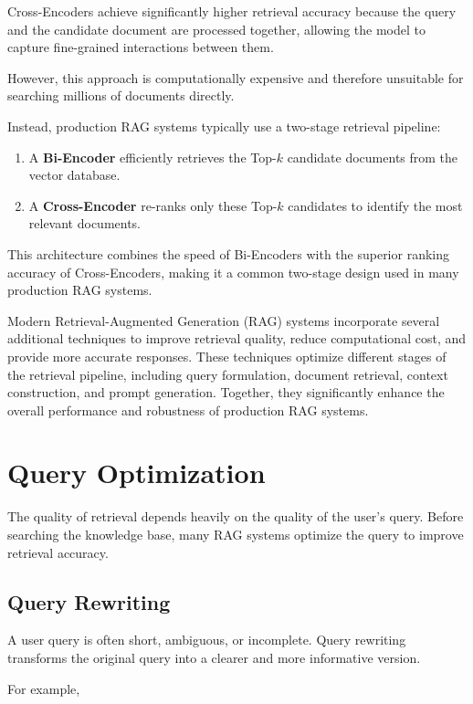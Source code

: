 Cross-Encoders achieve significantly higher retrieval accuracy because the query and the candidate document are processed together, allowing the model to capture fine-grained interactions between them.

However, this approach is computationally expensive and therefore unsuitable for searching millions of documents directly.

Instead, production RAG systems typically use a two-stage retrieval pipeline:

\begin{enumerate}
    \item A \textbf{Bi-Encoder} efficiently retrieves the Top-$k$ candidate documents from the vector database.
    \item A \textbf{Cross-Encoder} re-ranks only these Top-$k$ candidates to identify the most relevant documents.
\end{enumerate}

This architecture combines the speed of Bi-Encoders with the superior ranking accuracy of Cross-Encoders, making it a common two-stage design used in many production RAG systems.


Modern Retrieval-Augmented Generation (RAG) systems incorporate several additional techniques to improve retrieval quality, reduce computational cost, and provide more accurate responses. These techniques optimize different stages of the retrieval pipeline, including query formulation, document retrieval, context construction, and prompt generation. Together, they significantly enhance the overall performance and robustness of production RAG systems.

\section{Query Optimization}

The quality of retrieval depends heavily on the quality of the user's query. Before searching the knowledge base, many RAG systems optimize the query to improve retrieval accuracy.

\subsection*{Query Rewriting}

A user query is often short, ambiguous, or incomplete. Query rewriting transforms the original query into a clearer and more informative version.

For example,

